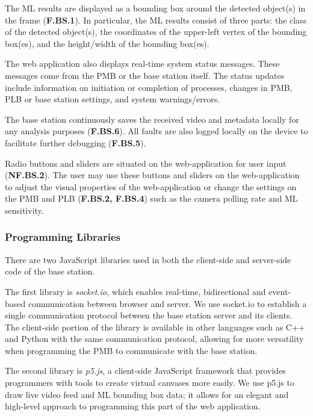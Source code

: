 The ML results are displayed as a bounding box around the detected object(s) in the frame (\textbf{F.BS.1}). In particular, the ML results consist of three parts: the class of the detected object(s), the coordinates of the upper-left vertex of the bounding box(es), and the height/width of the bounding box(es).

The web application also displays real-time system status messages. These messages come from the PMB or the base station itself. The status updates include information on initiation or completion of processes, changes in PMB, PLB or base station settings, and system warnings/errors.

The base station continuously saves the received video and metadata locally for any analysis purposes (\textbf{F.BS.6}). All faults are also logged locally on the device to facilitate further debugging (\textbf{F.BS.5}).

Radio buttons and sliders are situated on the web-application for user input (\textbf{NF.BS.2}). The user may use these buttons and sliders on the web-application to adjust the visual properties of the web-application or change the settings on the PMB and PLB (\textbf{F.BS.2, F.BS.4}) such as the camera polling rate and ML sensitivity.

\subsubsection{Programming Libraries}

There are two JavaScript libraries used in both the client-side and server-side code of the base station.

The first library is \textit{socket.io}, which enables real-time, bidirectional and event-based communication between browser and server. We use socket.io to establish a single communication protocol between the base station server and its clients. The client-side portion of the library is available in other languages such as C++ and Python with the same communication protocol, allowing for more versatility when programming the PMB to communicate with the base station. 

The second library is \textit{p5.js}, a client-side JavaScript framework that provides programmers with tools to create virtual canvases more easily. We use p5.js to draw live video feed and ML bounding box data; it allows for an elegant and high-level approach to programming this part of the web application.

